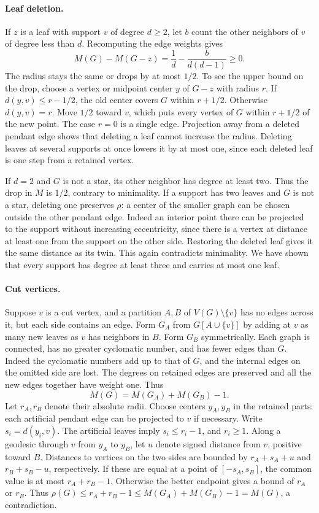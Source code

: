 \documentclass[11pt,a4paper]{article}
\begin{document}
\paragraph{Leaf deletion.}
If $z$ is a leaf with support $v$ of degree $d\ge2$, let $b$ count the
other neighbors of $v$ of degree less than $d$. Recomputing the edge
weights gives
\[
 M(G)-M(G-z)=\frac1d-\frac{b}{d(d-1)}\ge0.
\]
The radius stays the same or drops by at most $1/2$. To see the upper bound
on the drop, choose a vertex or midpoint center $y$ of $G-z$ with radius
$r$. If $d(y,v)\le r-1/2$, the old center covers $G$ within $r+1/2$.
Otherwise $d(y,v)=r$. Move $1/2$ toward $v$, which puts every vertex of
$G$ within $r+1/2$ of the new point. The case $r=0$ is a single edge.
Projection away from a deleted pendant edge shows that deleting a leaf
cannot increase the radius. Deleting leaves at several supports at once
lowers it by at most one, since each deleted leaf is one step from a
retained vertex.

If $d=2$ and $G$ is not a star, its other neighbor has degree at least
two. Thus the drop in $M$ is $1/2$, contrary to minimality. If a support
has two leaves and $G$ is not a star, deleting one preserves $\rho$:
a center of the smaller graph can be chosen outside the other pendant
edge. Indeed an interior point there can be projected to the support
without increasing eccentricity, since there is a vertex at distance
at least one from the support on the other side. Restoring the deleted
leaf gives it the same distance as its twin. This again contradicts
minimality. We have shown that every support has degree at least three
and carries at most one leaf.

\paragraph{Cut vertices.}
Suppose $v$ is a cut vertex, and a partition $A,B$ of $V(G)\setminus\{v\}$
has no edges across it, but each side contains an edge. Form $G_A$ from
$G[A\cup\{v\}]$ by adding at $v$ as many new leaves as $v$ has neighbors in
$B$. Form $G_B$ symmetrically. Each graph is connected, has no greater
cyclomatic number, and has fewer edges than $G$. Indeed the cyclomatic
numbers add up to that of $G$, and the internal edges on the omitted side
are lost. The degrees on retained edges are preserved and all the new
edges together have weight one. Thus
\[
 M(G)=M(G_A)+M(G_B)-1.
\]
Let $r_A,r_B$ denote their absolute radii. Choose centers $y_A,y_B$ in
the retained parts: each artificial pendant edge can be projected to
$v$ if necessary. Write $s_i=d(y_i,v)$. The artificial leaves imply
$s_i\le r_i-1$, and $r_i\ge1$. Along a geodesic through $v$ from $y_A$
to $y_B$, let $u$ denote signed distance from $v$, positive toward $B$.
Distances to vertices on the two sides are bounded by
$r_A+s_A+u$ and $r_B+s_B-u$, respectively. If these are equal at a
point of $[-s_A,s_B]$, the common value is at most $r_A+r_B-1$. Otherwise
the better endpoint gives a bound of $r_A$ or $r_B$. Thus
$\rho(G)\le r_A+r_B-1\le M(G_A)+M(G_B)-1=M(G)$, a contradiction.
\end{document}
